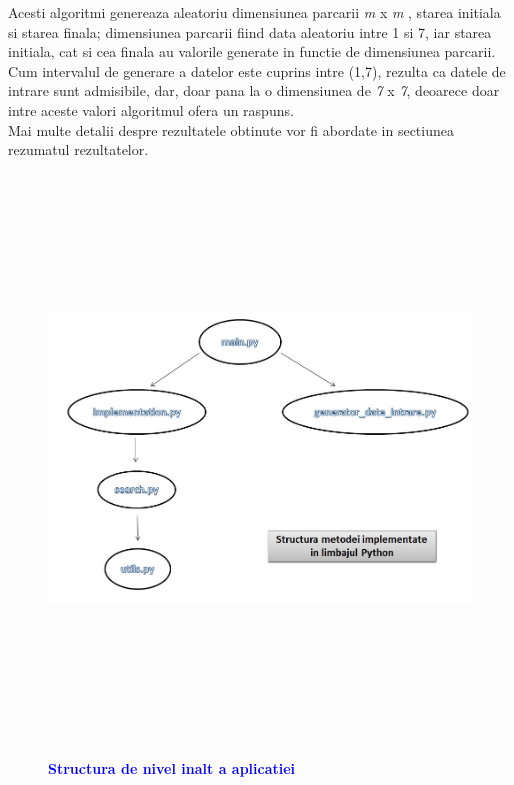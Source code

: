 \documentclass{article}
\begin{document}
Acesti algoritmi genereaza aleatoriu dimensiunea parcarii \emph m x \emph m , starea initiala si starea finala; dimensiunea parcarii fiind data aleatoriu intre 1 si 7, iar starea initiala, cat si cea finala au valorile generate in functie de dimensiunea parcarii. Cum intervalul de generare a datelor este cuprins intre (1,7), rezulta ca datele de intrare sunt admisibile, dar, doar pana la o dimensiunea de \emph 7 x \emph 7, deoarece doar intre aceste valori algoritmul ofera un raspuns.\\ Mai multe detalii despre rezultatele obtinute vor fi abordate in sectiunea rezumatul rezultatelor. 
\newpage
\begin{figure}
  \vspace{9mm}
  \centering
  \includegraphics[width=15cm, height=15cm]{structuradenivelinalt.jpg}
  \bfseries\caption{\textbf{\textcolor{blue}{Structura de nivel inalt a aplicatiei}}}
\end{figure}
\end{document}
